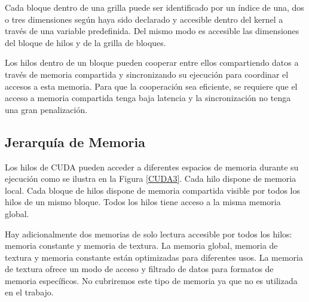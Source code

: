 \documentclass[a4paper,openright,12pt, oneside]{book}
\begin{document}
Cada bloque dentro de una grilla puede ser identificado por un \'indice de una,
dos o tres dimensiones seg\'un haya sido declarado y accesible dentro del kernel
a trav\'es de una variable predefinida. Del mismo modo es accesible las dimensiones
del bloque de hilos y de la grilla de bloques. 

Los hilos dentro de un bloque pueden cooperar entre ellos compartiendo datos
a trav\'es de memoria compartida y sincronizando su ejecuci\'on para coordinar el accesos
a esta memoria. Para que la cooperaci\'on sea eficiente, se requiere que el acceso a memoria
compartida tenga baja latencia y la sincronizaci\'on no tenga una gran penalizaci\'on.

\subsection*{Jerarqu\'ia de Memoria}

Los hilos de CUDA pueden acceder a diferentes espacios de memoria durante su ejecuci\'on como
se ilustra en la Figura \ref{CUDA3}. Cada hilo dispone de memoria local. Cada bloque de hilos
dispone de memoria compartida visible por todos los hilos de un mismo bloque. Todos
los hilos tiene acceso a la misma memoria global.

Hay adicionalmente dos memorias de solo lectura accesible por todos los hilos: memoria
constante y memoria de textura. La memoria global, memoria de textura y memoria
constante est\'an optimizadas para diferentes usos. La memoria de textura ofrece un
modo de acceso y filtrado de datos para formatos de memoria espec\'ificos. No cubriremos
este tipo de memoria ya que no es utilizada en el trabajo.
\end{document}
